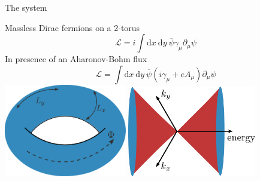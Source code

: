 \documentclass[11pt,aspectratio=169]{beamer}
\begin{document}
\begin{frame}{The system}

{Massless Dirac fermions on a 2-torus}
\[\mathcal{L} = i\int \mathrm{d}x~\mathrm{d}y~\overline\psi\gamma_\mu\partial_\mu \psi\]
{In presence of an Aharonov-Bohm flux}
\[\mathcal{L} = \int \mathrm{d}x~\mathrm{d}y~\overline\psi \left(i\gamma_\mu + eA_\mu\right)\partial_\mu \psi\]
\includegraphics[width=0.4\textwidth]{figures/torus.pdf}
\hspace*{\fill}
\includegraphics[width=0.42\textwidth]{figures/dirac.pdf}

\end{frame}
\end{document}
